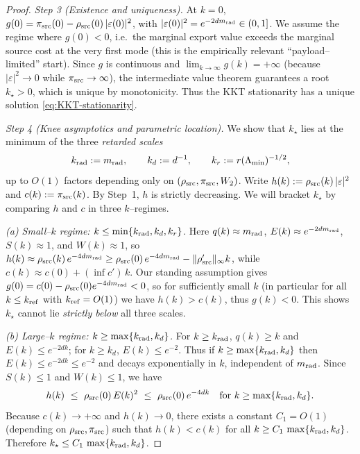 \documentclass[10pt]{article}
\theoremstyle{definition}
\theoremstyle{plain}
\begin{document}
\begin{proof}
\smallskip
\noindent\emph{Step 3 (Existence and uniqueness).}
At $k=0$, $g(0)=\pi_{\rm src}(0)-\rho_{\rm src}(0)\,|\varepsilon(0)|^2$, with $|\varepsilon(0)|^2=e^{-2dm_{\rm rad}}\in(0,1]$. We assume the regime where $g(0)<0$, i.e.\ the marginal export value exceeds the marginal source cost at the very first mode (this is the empirically relevant “payload–limited” start). Since $g$ is continuous and $\lim_{k\to\infty} g(k)=+\infty$ (because $|\varepsilon|^2\to 0$ while $\pi_{\rm src}\to\infty$), the intermediate value theorem guarantees a root $k_\star>0$, which is unique by monotonicity. Thus the KKT stationarity has a unique solution \eqref{eq:KKT-stationarity}.

\smallskip
\noindent\emph{Step 4 (Knee asymptotics and parametric location).}
We show that $k_\star$ lies at the minimum of the three \emph{retarded scales}
\[
k_{\rm rad}:=m_{\rm rad},\qquad k_d:=d^{-1},\qquad k_r:=r(\Lambda_{\min})^{-1/2},
\]
up to $O(1)$ factors depending only on $(\rho_{\rm src},\pi_{\rm src},W_2)$.
Write $h(k):=\rho_{\rm src}(k)\,|\varepsilon|^2$ and $c(k):=\pi_{\rm src}(k)$. By Step~1, $h$ is strictly decreasing.
We will bracket $k_\star$ by comparing $h$ and $c$ in three $k$–regimes.

\smallskip
\noindent\emph{(a) Small–$k$ regime: $k\le \min\{k_{\rm rad},k_d,k_r\}$.}
Here $q(k)\approx m_{\rm rad}$, $E(k)\approx e^{-2dm_{\rm rad}}$, $S(k)\approx 1$, and $W(k)\approx 1$,
so $h(k)\approx \rho_{\rm src}(k)\,e^{-4dm_{\rm rad}}\ge \rho_{\rm src}(0)\,e^{-4dm_{\rm rad}} - \|\rho_{\rm src}'\|_\infty k$,
while $c(k)\approx c(0) + (\inf c')\,k$. Our standing assumption gives $g(0)=c(0)-\rho_{\rm src}(0)e^{-4dm_{\rm rad}}<0$,
so for sufficiently small $k$ (in particular for all $k\le k_{\rm ref}$ with $k_{\rm ref}=O(1)$) we have $h(k)>c(k)$, thus $g(k)<0$.
This shows $k_\star$ cannot lie \emph{strictly below} all three scales.

\smallskip
\noindent\emph{(b) Large–$k$ regime: $k\ge \max\{k_{\rm rad},k_d\}$.}
For $k\ge k_{\rm rad}$, $q(k)\ge k$ and $E(k)\le e^{-2dk}$; for $k\ge k_d$, $E(k)\le e^{-2}$. Thus if $k\ge \max\{k_{\rm rad},k_d\}$ then $E(k)\le e^{-2dk}\le e^{-2}$ and decays exponentially in $k$, independent of $m_{\rm rad}$. Since $S(k)\le 1$ and $W(k)\le 1$, we have
\begin{equation}\label{eq:h-exp-decay}
h(k)\ \le\ \rho_{\rm src}(0)\,E(k)^2\ \le\ \rho_{\rm src}(0)\,e^{-4dk}\quad\text{for }k\ge \max\{k_{\rm rad},k_d\}.
\end{equation}
Because $c(k)\to +\infty$ and $h(k)\to 0$, there exists a constant $C_1=O(1)$ (depending on $\rho_{\rm src},\pi_{\rm src}$) such that $h(k)<c(k)$ for all $k\ge C_1\,\max\{k_{\rm rad},k_d\}$. Therefore $k_\star\le C_1\,\max\{k_{\rm rad},k_d\}$.


\end{proof}
\end{document}
